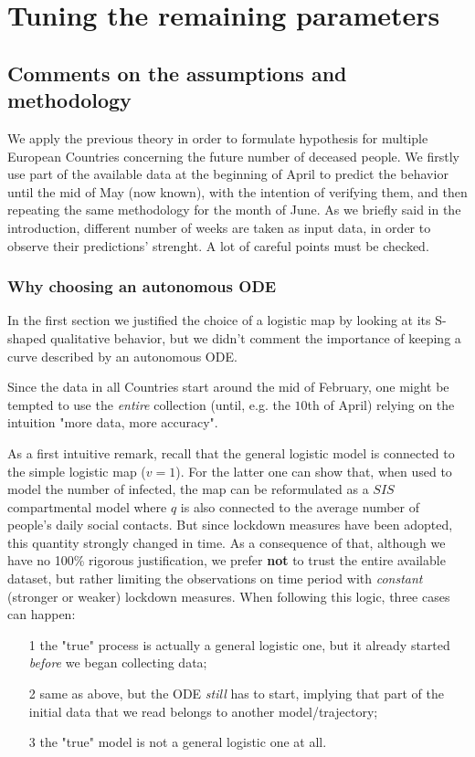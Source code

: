 \documentclass[8pt]{article}
\begin{document}
\section{Tuning the remaining parameters}

\subsection{Comments on the assumptions and methodology}
We apply the previous theory in order to formulate hypothesis 
for multiple European Countries concerning the future number of
deceased people. We firstly use part of the available data at the beginning
of April to predict the behavior until the mid of May (now known),
with the intention of verifying them, and then
repeating the same methodology for the month of June.
As we briefly said in the introduction, different number of weeks
are taken as input data, in order to observe their predictions' strenght.
A lot of careful points must be checked.


\subsubsection{Why choosing an autonomous ODE}
In the first section we justified the choice of a logistic map by looking
at its S-shaped qualitative behavior, but we didn't comment the
importance of keeping
a curve described by an autonomous ODE.


Since the data in all Countries start around the mid
of February, one might be tempted to use the \emph{entire}
collection (until, e.g. the $10$th of April)
relying on the intuition "more data, more accuracy".


As a first intuitive remark,
recall that the general logistic model is connected to the simple
logistic map ($v = 1$). For the latter one can show that,
when used to model the number of infected,
the map can be reformulated as a $SIS$ compartmental model
where $q$ is also connected to the average number of people's
daily social contacts.
But since lockdown measures have been adopted, this quantity
strongly changed in time. As a consequence of that, although
we have no 100\% rigorous justification,
we prefer \textbf{not} to trust the entire available dataset, but rather
limiting the observations on time period with
\emph{constant} (stronger or weaker) lockdown measures.
When following this logic, three cases can happen:
\begin{itemize}
	\item[1] the "true" process is actually a general logistic one,
		but it already started \emph{before} we began collecting data;
	\item[2] same as above, but the ODE \emph{still} has
		to start, implying that part of the
		initial data that we read belongs to
		another model/trajectory;
	\item[3] the "true" model is not a general logistic one at all.
\end{itemize}
\end{document}
